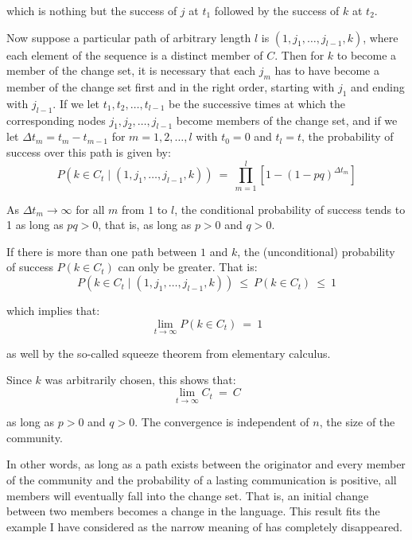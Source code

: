 \noindent which is nothing but the success of $j$ at $t_1$ followed by the success of $k$ at $t_2$.

Now suppose a particular path of arbitrary length $l$ is $(1, j_1, \ldots , j_{l - 1}, k)$, where each element of the sequence is a distinct member of $C$. Then for $k$ to become a member of the change set, it is necessary that each $j_m$ has to have become a member of the change set first and in the right order, starting with $j_1$ and ending with $j_{l - 1}$. If we let $t_1, t_2, \ldots , t_{l - 1}$ be the successive times at which the corresponding nodes $j_1, j_2, \ldots , j_{l - 1}$ become members of the change set, and if we let $\Delta t_{m} = t_m - t_{m - 1}$ for $m = 1, 2, \ldots , l$ with $t_0 = 0$ and $t_l = t$, the probability of success over this path is given by:
\begin{equation}
P(k \in C_t \mid (1, j_1, \ldots , j_{l - 1}, k))\ =\ \prod_{m = 1}^{l} [1 - (1 - pq)^{\Delta t_{m}}]
\label{eq:connected}
\end{equation}

As $\Delta t_{m} \rightarrow \infty$ for all $m$ from $1$ to $l$, the conditional probability of success tends to 1 as long as $pq > 0$, that is, as long as $p > 0$ and $q > 0$. 

If there is more than one path between $1$ and $k$, the (unconditional) probability of success $P(k \in C_t)$ can only be greater. That is: \[ P(k \in C_t \mid (1, j_1, \ldots , j_{l - 1}, k))\ \leq\ P(k \in C_t)\ \leq\ 1 \] 

\noindent which implies that:
\begin{equation}
\lim_{t \rightarrow \infty} P(k \in C_t)\ =\ 1
\end{equation}

\noindent as well by the so-called squeeze theorem from elementary calculus.

Since $k$ was arbitrarily chosen, this shows that: \[ \lim_{t \rightarrow \infty} C_t\ =\ C \] 

\noindent as long as $p > 0$ and $q > 0$. The convergence is independent of $n$, the size of the community. 

In other words, as long as a path exists between the originator and every member of the community and the probability of a lasting communication is positive, all members will eventually fall into the change set. That is, an initial change between two members becomes a change in the language. This result fits the example I have considered as the narrow meaning of  has completely disappeared. 

